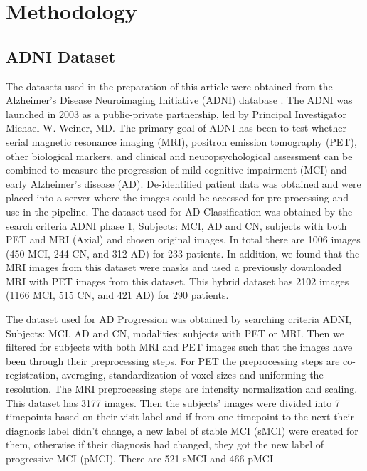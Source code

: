 \section{Methodology}
\label{sec:method}
\subsection{ADNI Dataset}
The datasets used in the preparation of this article were obtained from the Alzheimer’s Disease Neuroimaging Initiative (ADNI) database \cite{lu_multimodal_2018}. The ADNI was launched in 2003 as a public-private partnership, led by Principal Investigator Michael W. Weiner, MD. The primary goal of ADNI has been to test whether serial magnetic resonance imaging (MRI), positron emission tomography (PET), other biological markers, and clinical and neuropsychological assessment can be combined to measure the progression of mild cognitive impairment (MCI) and early Alzheimer’s disease (AD). De-identified patient data was obtained and were placed into a server where the images could be accessed for pre-processing and use in the pipeline. The dataset used for AD Classification was obtained by the search criteria ADNI phase 1, Subjects: MCI, AD and CN, subjects with both PET and MRI (Axial) and chosen original images. In total there are 1006 images (450 MCI, 244 CN, and 312 AD) for 233 patients. In addition, we found that the MRI images from this dataset were masks and used a previously downloaded MRI with PET images from this dataset.   This hybrid dataset has 2102 images (1166 MCI, 515 CN, and 421 AD) for 290 patients.  

The dataset used for AD Progression was obtained by searching criteria ADNI, Subjects: MCI, AD and CN, modalities: subjects with PET or MRI. Then we filtered for subjects with both MRI and PET images such that the images have been through their preprocessing steps. For PET the preprocessing steps are co-registration, averaging, standardization of voxel sizes and uniforming the resolution.  The MRI preprocessing steps are intensity normalization and scaling. This dataset has 3177 images. Then the subjects’ images were divided into 7 timepoints based on their visit label and if from one timepoint to the next their diagnosis label didn’t change, a new label of stable MCI (sMCI) were created for them, otherwise if their diagnosis had changed, they got the new label of progressive MCI (pMCI). There are 521 sMCI and 466 pMCI

